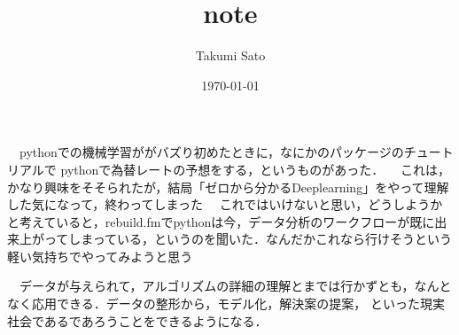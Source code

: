 \documentclass[11pt]{article}
\author{Takumi Sato}
\date{\today}
\title{note}
\begin{document}
\maketitle
\tableofcontents


　pythonでの機械学習ががバズり初めたときに，なにかのパッケージのチュートリアルで
pythonで為替レートの予想をする，というものがあった．
　これは，かなり興味をそそられたが，結局「ゼロから分かるDeeplearning」をやって理解した気になって，終わってしまった
　これではいけないと思い，どうしようかと考えていると，rebuild.fmでpythonは今，データ分析のワークフローが既に出来上がってしまっている，というのを聞いた．なんだかこれなら行けそうという軽い気持ちでやってみようと思う

　データが与えられて，アルゴリズムの詳細の理解とまでは行かずとも，なんとなく応用できる．データの整形から，モデル化，解決案の提案，
といった現実社会であるであろうことをできるようになる．
\end{document}

